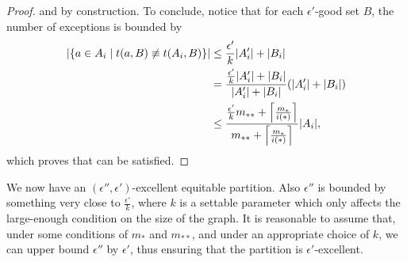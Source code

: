 \begin{lemma}
\begin{proof}
                 and
                 by construction.
                To conclude, notice that for each $\epsilon'$-good set $B$, the number of exceptions is bounded by
                \begin{align*}
                    | \{ a \in A_i \mid t(a, B) \not\equiv t(A_i, B) \} |
                        & \leq \frac{\epsilon'}{k} | A_i' | + | B_i | \\
                        & = \frac{\frac{\epsilon'}{k} | A_i' | + | B_i |}{| A_i' | + | B_i |}
                            ( | A_i' | + | B_i | ) \\
                        & \leq \frac{\frac{\epsilon'}{k} m_{**} + \left\lceil \frac{m_*}{i(*)} \right\rceil}{m_{**} + \left\lceil \frac{m_*}{i(*)} \right\rceil}
                            | A_i |,
                \end{align*}
                which proves that  can be satisfied.
            \end{proof}
        \end{lemma}

        We now have an $(\epsilon'', \epsilon')$-excellent equitable partition.
        Also $\epsilon''$ is bounded by something very close to $\frac{\epsilon'}{k}$, where $k$ is a settable parameter
        which only affects the large-enough condition on the size of the graph.
        It is reasonable to assume that, under some conditions of $m_*$ and $m_{**}$, and under an appropriate choice of $k$,
        we can upper bound $\epsilon''$ by $\epsilon'$, thus ensuring that the partition is $\epsilon'$-excellent.

